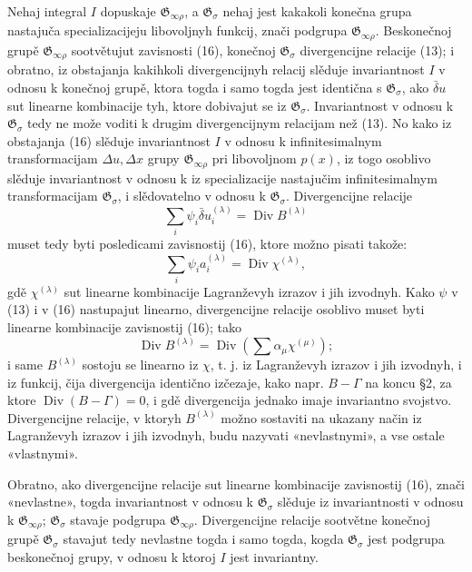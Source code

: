 \documentclass[11pt]{article}
\providecommand{\G}{\mathfrak G}
\providecommand{\D}{\Delta}
\DeclareMathOperator{\Div}{Div}
\providecommand{\bd}{\bar{\delta}}
\begin{document}
Nehaj integral \(I\) dopuskaje \(\G_{\infty\rho}\), a \(\G_\sigma\) nehaj jest kakakoli konečna grupa nastajuča specializacijeju libovoljnyh funkcij, znači podgrupa \(\G_{\infty\rho}\). Beskonečnoj grupě \(\G_{\infty\rho}\) sootvětujut zavisnosti (16), konečnoj \(\G_\sigma\) divergencijne relacije (13); i obratno, iz obstajanja kakihkoli divergencijnyh relacij slěduje invariantnost \(I\) v odnosu k konečnoj grupě, ktora togda i samo togda jest identična s \(\G_\sigma\), ako \(\bd u\) sut linearne kombinacije tyh, ktore dobivajut se iz \(\G_\sigma\). Invariantnost v odnosu k \(\G_\sigma\) tedy ne može voditi k drugim divergencijnym relacijam než (13). No kako iz obstajanja (16) slěduje invariantnost \(I\) v odnosu k infinitesimalnym transformacijam \(\D u,\D x\) grupy \(\G_{\infty\rho}\) pri libovoljnom \(p(x)\), iz togo osoblivo slěduje invariantnost v odnosu k iz specializacije nastajučim infinitesimalnym transformacijam \(\G_\sigma\), i slědovatelno v odnosu k \(\G_\sigma\). Divergencijne relacije
\[
\sum_i\psi_i\bd u_i^{(\lambda)}=\Div B^{(\lambda)}
\]
muset tedy byti posledicami zavisnostij (16), ktore možno pisati takože:
\[
\sum_i\psi_i a_i^{(\lambda)}=\Div\chi^{(\lambda)},
\]
gdě \(\chi^{(\lambda)}\) sut linearne kombinacije Lagranževyh izrazov i jih izvodnyh. Kako \(\psi\) v (13) i v (16) nastupajut linearno, divergencijne relacije osoblivo muset byti linearne kombinacije zavisnostij (16); tako
\[
\Div B^{(\lambda)}=\Div\left(\sum \alpha_\mu\chi^{(\mu)}\right);
\]
i same \(B^{(\lambda)}\) sostoju se linearno iz \(\chi\), t. j. iz Lagranževyh izrazov i jih izvodnyh, i iz funkcij, čija divergencija identično izčezaje, kako napr. \(B-\Gamma\) na koncu \S{}2, za ktore \(\Div(B-\Gamma)=0\), i gdě divergencija jednako imaje invariantno svojstvo. Divergencijne relacije, v ktoryh \(B^{(\lambda)}\) možno sostaviti na ukazany način iz Lagranževyh izrazov i jih izvodnyh, budu nazyvati «nevlastnymi», a vse ostale «vlastnymi».

Obratno, ako divergencijne relacije sut linearne kombinacije zavisnostij (16), znači «nevlastne», togda invariantnost v odnosu k \(\G_\sigma\) slěduje iz invariantnosti v odnosu k \(\G_{\infty\rho}\); \(\G_\sigma\) stavaje podgrupa \(\G_{\infty\rho}\). Divergencijne relacije sootvětne konečnoj grupě \(\G_\sigma\) stavajut tedy nevlastne togda i samo togda, kogda \(\G_\sigma\) jest podgrupa beskonečnoj grupy, v odnosu k ktoroj \(I\) jest invariantny.
\end{document}

